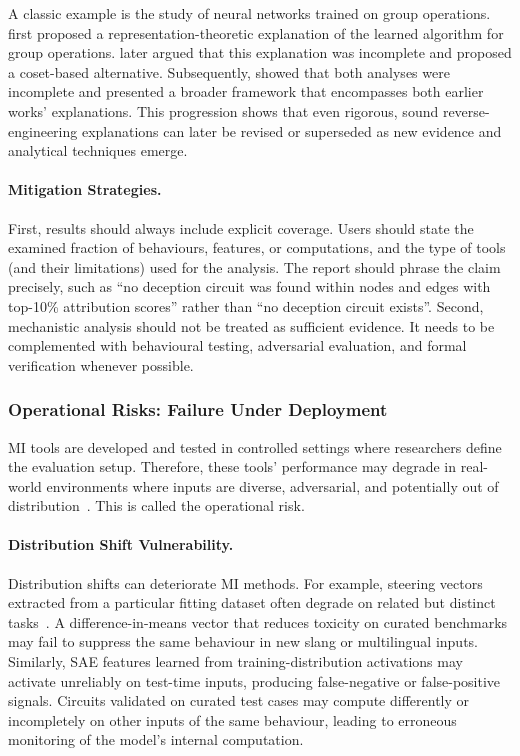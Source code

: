 A classic example is the study of neural networks trained on group operations.  first proposed a representation-theoretic explanation of the learned algorithm for group operations.  later argued that this explanation was incomplete and proposed a coset-based alternative. Subsequently,  showed that both analyses were incomplete and presented a broader framework that encompasses both earlier works’ explanations. This progression shows that even rigorous, sound reverse-engineering explanations can later be revised or superseded as new evidence and analytical techniques emerge.


\paragraph{Mitigation Strategies.}
First, results should always include explicit coverage. Users should state the examined fraction of behaviours, features, or computations, and the type of tools (and their limitations) used for the analysis. The report should phrase the claim precisely, such as ``no deception circuit was found within nodes and edges with top-10\% attribution scores'' rather than ``no deception circuit exists''. Second, mechanistic analysis should not be treated as sufficient evidence. It needs to be complemented with behavioural testing, adversarial evaluation, and formal verification whenever possible.


\subsubsection{Operational Risks: Failure Under Deployment}

MI tools are developed and tested in controlled settings where researchers define the evaluation setup. Therefore, these tools’ performance may degrade in real-world environments where inputs are diverse, adversarial, and potentially out of distribution~. This is called the operational risk.

\paragraph{Distribution Shift Vulnerability.}
Distribution shifts can deteriorate MI methods. For example, steering vectors extracted from a particular fitting dataset often degrade on related but distinct tasks~. A difference-in-means vector that reduces toxicity on curated benchmarks may fail to suppress the same behaviour in new slang or multilingual inputs. Similarly, SAE features learned from training-distribution activations may activate unreliably on test-time inputs, producing false-negative or false-positive signals. Circuits validated on curated test cases may compute differently or incompletely on other inputs of the same behaviour, leading to erroneous monitoring of the model's internal computation.


